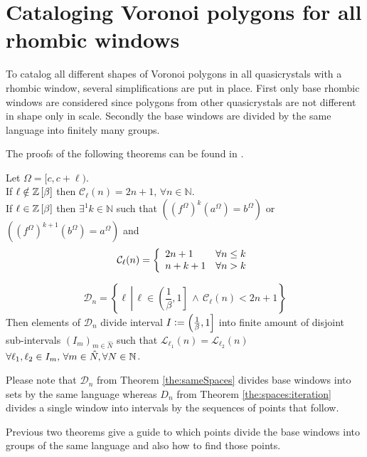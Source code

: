 \documentclass[text.tex]{subfiles}
\begin{document}
\section{Cataloging Voronoi polygons for all rhombic windows}

To catalog all different shapes of Voronoi polygons in all quasicrystals with a rhombic window, several simplifications are put in place.
First only base rhombic windows are considered since polygons from other quasicrystals are not different in shape only in scale. Secondly the base windows are divided by the same language into finitely many groups. 

The proofs of the following theorems can be found in \cite{combinatorial}.

\begin{theorem}
\label{the:complexity}
Let $\Omega = [c,c+\ell)$.\\
If $\ell \notin \mathbb{Z}\left[\beta\right]$ then $\mathcal{C}_{\ell}(n) = 2n+1,\, \forall n\in\mathbb{N}$. \\
If $\ell \in \mathbb{Z}\left[\beta\right]$ then $\exists^1 k \in \mathbb{N}$ such that $\left({(f^\Omega)}^{k}(a^\Omega) = b^\Omega\right)$ or $\left({(f^\Omega)}^{k+1}(b^\Omega) = a^\Omega\right)$ and 
$$\mathcal{C}_{\ell}(n) = \left\{
	\begin{array}{l l}
		2n+1	&	\forall n\leq k \\
		n+k+1	&	\forall n > k
	\end{array}
	\right.
$$
\end{theorem}

\begin{theorem}
\label{the:sameSpaces}
$$\mathcal{D}_n = \left\{ \ell\,\left|\, \ell\in \left(\frac{1}{\beta},1\right] \,\wedge\, \mathcal{C}_\ell(n) < 2n+1 \right.\right\}$$
Then elements of $\mathcal{D}_n$ divide interval $I \vcentcolon= \left(\frac{1}{\beta},1\right]$ into finite amount of disjoint sub-intervals $(I_m)_{m\in\widehat{N}}$ such that $\mathcal{L}_{\ell_1}(n) = \mathcal{L}_{\ell_2}(n)$ $\forall \ell_1, \ell_2 \in I_m,\, \forall m\in\hat{N}, \forall N\in\mathbb{N}$.
\end{theorem}

\begin{remark}
Please note that $\mathcal{D}_n$ from Theorem \ref{the:sameSpaces} divides base windows into sets by the same language whereas $D_n$ from Theorem \ref{the:spaces:iteration} divides a single window into intervals by the sequences of points that follow.
\end{remark}

Previous two theorems give a guide to which points divide the base windows into groups of the same language and also how to find those points. 
\end{document}
